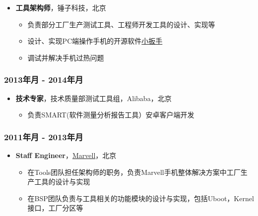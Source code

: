 \documentclass[11pt,dvipdfmx,CJKbookmarks]{article}
\begin{document}
\begin{CJK*}{UTF8}{simsun}
\begin{itemize}
\begin{itemize}
\begin{itemize}
\item 拍摄了两小时长的\thinspace Linux\thinspace 系统工具使用技巧视频，在\thinspace \href{https://www.youtube.com/watch?v\%3Dqp2b3-Guej0}{YouTube}\thinspace 和\thinspace \href{https://www.bilibili.com/video/av3376647/}{bilibili}\thinspace 上
\end{itemize}
\end{itemize}

\item \textbf{工具架构师}，锤子科技，北京

\begin{itemize}
\item 负责部分工厂生产测试工具、工程师开发工具的设计、实现等
\item 设计、实现\thinspace PC\thinspace 端操作手机的开源软件\thinspace \href{https://github.com/SmartisanTech/Wrench}{小扳手}
\item 调试并解决手机过热问题
\end{itemize}
\end{itemize}

\subsubsection{2013\thinspace 年\thinspace 月 - 2014\thinspace 年\thinspace 月}
\label{sec:org7f22c87}
\begin{itemize}
\item \textbf{技术专家}，技术质量部测试工具组，Alibaba，北京
\begin{itemize}
\item 负责\thinspace SMART(软件测量分析报告工具）安卓客户端开发
\end{itemize}
\end{itemize}

\subsubsection{2011\thinspace 年\thinspace 月 - 2013\thinspace 年\thinspace 月}
\label{sec:org9415787}
\begin{itemize}
\item \textbf{Staff Engineer}，\href{http://marvell.com}{Marvell}，北京

\begin{itemize}
\item 在\thinspace Tools\thinspace 团队担任架构师的职务，负责\thinspace Marvell\thinspace 手机整体解决方案中工厂生产工具的设计与实现
\item 在\thinspace BSP\thinspace 团队负责与工具相关的功能模块的设计与实现，包括\thinspace Uboot，Kernel\thinspace 接口，工厂分区等
\end{itemize}
\end{itemize}

\end{CJK*}
\end{document}
